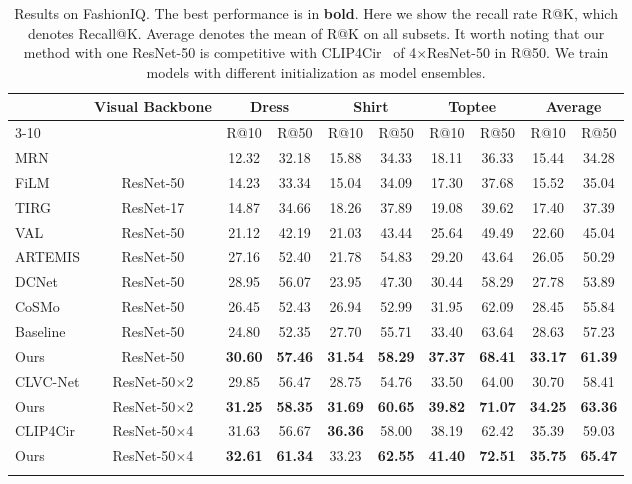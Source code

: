 \documentclass[10pt,twocolumn,letterpaper]{article}
\begin{document}
\begin{table*}[]
\centering
\small
    \begin{tabular}{l|c|cccccc|cc}
    \shline
    \multirow{2}{*}{Method} & \multirow{2}{*}{Visual Backbone} & \multicolumn{2}{c}{Dress} & \multicolumn{2}{c}{Shirt} & \multicolumn{2}{c}{Toptee} & \multicolumn{2}{|c}{Average}\\\cline{3-10}
    \multirow{2}{*}{} & \multirow{2}{*}{} &  R@10 & R@50 & R@10 & R@50 & R@10 & R@50 & R@10 & R@50\\\shline
    MRN \cite{MRN} & ResNet-152 & 12.32 & 32.18 & 15.88 & 34.33 & 18.11 & 36.33 & 15.44 & 34.28 \\
    FiLM \cite{perez2018film} & ResNet-50 & 14.23 & 33.34 & 15.04 & 34.09 & 17.30 & 37.68 & 15.52 & 35.04 \\
    TIRG \cite{TIRG} & ResNet-17 & 14.87 & 34.66 & 18.26 & 37.89 & 19.08 & 39.62 & 17.40 & 37.39 \\
    VAL \cite{Chen_2020_CVPR} & ResNet-50 & 21.12 & 42.19 & 21.03 & 43.44 & 25.64 & 49.49 & 22.60 & 45.04 \\
    ARTEMIS \cite{delmas2022artemis} & ResNet-50 & 27.16 & 52.40 & 21.78 & 54.83 & 29.20 & 43.64 & 26.05 & 50.29 \\
    DCNet \cite{kim:2021:AAAI} & ResNet-50 & 28.95 & 56.07 & 23.95 & 47.30 & 30.44 & 58.29 & 27.78 & 53.89 \\
    CoSMo \cite{2021CoSMo} & ResNet-50 & 26.45 & 52.43 & 26.94 & 52.99 & 31.95 & 62.09 & 28.45 & 55.84 \\
\hline 
    Baseline & ResNet-50 & 24.80 & 52.35 & 27.70 & 55.71 & 33.40 & 63.64 & 28.63 & 57.23\\
    Ours & ResNet-50 & \textbf{{30.60}} & \textbf{{57.46}} & \textbf{31.54} & \textbf{58.29} & \textbf{{37.37}} & \textbf{{68.41}} & \textbf{{33.17}} & \textbf{{61.39}}\\
    \shline
    CLVC-Net \cite{CLVC-Net} & ResNet-50$\times$2 & 29.85 & 56.47 & 28.75 & 54.76 & 33.50 & 64.00 & 30.70 & 58.41 \\
    Ours & ResNet-50$\times$2 & \textbf{{31.25}} & \textbf{{58.35}} & \textbf{{31.69}} & \textbf{{60.65}} & \textbf{{39.82}} & \textbf{{71.07}} & \textbf{{34.25}} & \textbf{{63.36}}\\ 
    \shline
    CLIP4Cir \cite{CLIP4Cir} & ResNet-50$\times$4 & 31.63 & 56.67 & \textbf{{36.36}} & 58.00 & 38.19 & 62.42 & 35.39 & 59.03 \\
    Ours & ResNet-50$\times$4 & \textbf{32.61} & \textbf{61.34} & 33.23 & \textbf{62.55} & \textbf{41.40} & \textbf{72.51} & \textbf{35.75} & \textbf{65.47}\\
    \shline
    \end{tabular}
    \vspace{-.1in}
    \caption{Results on FashionIQ. The best performance is in \textbf{bold}. Here we show the recall rate R@K, which denotes Recall@K. Average denotes the mean of R@K on all subsets. It worth noting that our method with one ResNet-50 is competitive with CLIP4Cir~\cite{CLIP4Cir} of 4$\times$ResNet-50 in R@50. We train models with different initialization as model ensembles.} 
    \label{tab:Recall rates on fashionIQ}
    \vspace{-.2in}
\end{table*}
\end{document}
